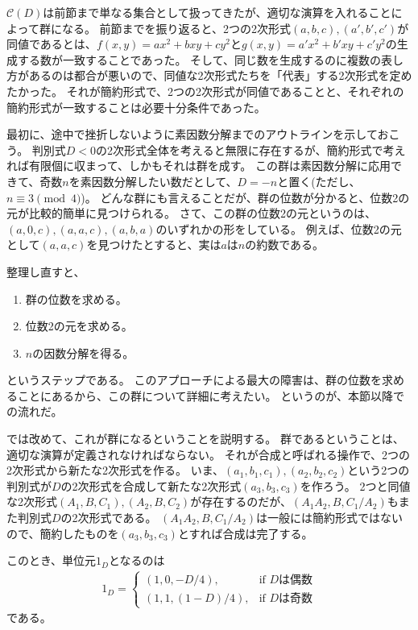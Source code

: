 $\mathcal{C}(D)$は前節まで単なる集合として扱ってきたが、適切な演算を入れることによって群になる。
前節までを振り返ると、2つの2次形式$(a,b,c),(a',b',c')$が同値であるとは、$f(x,y)=ax^2+bxy+cy^2$と$g(x,y)=a'x^2+b'xy+c'y^2$の生成する数が一致することであった。
そして、同じ数を生成するのに複数の表し方があるのは都合が悪いので、同値な2次形式たちを「代表」する2次形式を定めたかった。
それが簡約形式で、2つの2次形式が同値であることと、それぞれの簡約形式が一致することは必要十分条件であった。

最初に、途中で挫折しないように素因数分解までのアウトラインを示しておこう。
判別式$D<0$の2次形式全体を考えると無限に存在するが、簡約形式で考えれば有限個に収まって、しかもそれは群を成す。
この群は素因数分解に応用できて、奇数$n$を素因数分解したい数だとして、$D=-n$と置く(ただし、$n\equiv3\pmod{4}$)。
どんな群にも言えることだが、群の位数が分かると、位数2の元が比較的簡単に見つけられる。
さて、この群の位数2の元というのは、$(a,0,c),(a,a,c),(a,b,a)$のいずれかの形をしている。
例えば、位数2の元として$(a,a,c)$を見つけたとすると、実は$a$は$n$の約数である。

整理し直すと、
\begin{enumerate}
 \item 群の位数を求める。
 \item 位数2の元を求める。
 \item $n$の因数分解を得る。
\end{enumerate}
というステップである。
このアプローチによる最大の障害は、群の位数を求めることにあるから、この群について詳細に考えたい。
というのが、本節以降での流れだ。

では改めて、これが群になるということを説明する。
群であるということは、適切な演算が定義されなければならない。
それが合成と呼ばれる操作で、2つの2次形式から新たな2次形式を作る。
いま、$(a_1,b_1,c_1), (a_2,b_2,c_2)$という2つの判別式が$D$の2次形式を合成して新たな2次形式$(a_3,b_3,c_3)$を作ろう。
2つと同値な2次形式$(A_1,B,C_1), (A_2,B,C_2)$が存在するのだが、$(A_1A_2,B,C_1/A_2)$もまた判別式$D$の2次形式である。
$(A_1A_2,B,C_1/A_2)$は一般には簡約形式ではないので、簡約したものを$(a_3,b_3,c_3)$とすれば合成は完了する。

このとき、単位元$1_D$となるのは
\begin{align*}
1_D = \begin{cases}
(1, 0, -D/4),& \mbox{if $D$は偶数}\\
(1, 1, (1-D)/4),& \mbox{if $D$は奇数}
\end{cases}
\end{align*}
である。


